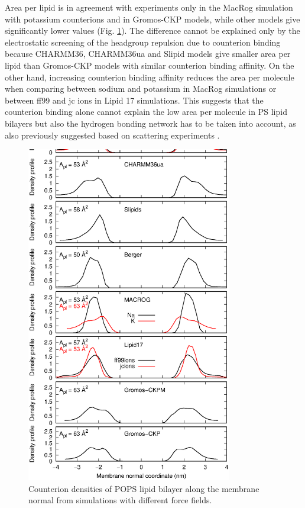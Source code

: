 \documentclass[aps,prl,superscriptaddress,twocolumn]{revtex4}
\begin{document}
Area per lipid is in agreement with experiments \cite{pan14} only
in the MacRog simulation with potassium counterions and in Gromos-CKP models,
while other models give significantly lower values (Fig. \ref{NAdensPOPS}).
The difference cannot be explained only by the electrostatic screening of the headgroup repulsion due to 
counterion binding because CHARMM36, CHARMM36ua and Slipid models give
smaller area per lipid than Gromos-CKP models with similar counterion binding affinity.
On the other hand, increasing counterion binding affinity reduces the area per molecule
when comparing between sodium and potassium in MacRog simulations or between
ff99 and jc ions in Lipid 17 simulations.
This suggests that the counterion binding alone cannot explain the low area per molecule
in PS lipid bilayers but also the hydrogen bonding network has to
be taken into account, as also previously suggested based on scattering experiments \cite{petrache04}.
\begin{figure}[]
  \centering
  \includegraphics[width=9.0cm]{../Figs/NAdensPOPS.eps}
  \caption{\label{NAdensPOPS}
    Counterion densities of POPS lipid bilayer along the membrane normal from
    simulations with different force fields.
  }
\end{figure}
\end{document}
